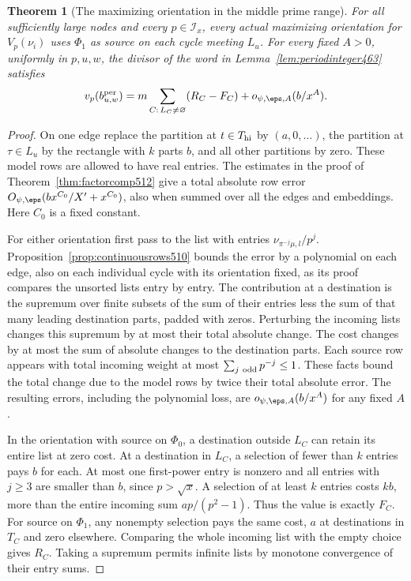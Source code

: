\documentclass[a4paper,11pt]{article}
\newtheorem{theorem}[proposition]{Theorem}
\theoremstyle{definition}
\theoremstyle{remark}
\numberwithin{equation}{section}
\begin{document}
\begin{theorem}[The maximizing orientation in the middle prime range]
\leavevmode\label{thm:cycleorientation674}
For all sufficiently large nodes and every \(p\in\mathcal I_x\),
every actual maximizing orientation for \(V_p(\nu_i)\) uses
\(\Phi_1\) as source on each cycle meeting \(L_u\). For every
fixed \(A>0\), uniformly in \(p,u,w\), the divisor of the word
in Lemma~\ref{lem:periodinteger463} satisfies
\[
 v_p(b^{\rm per}_{u,w})=
 m\sum_{C:\,L_C\ne\varnothing}(R_C-F_C)
                      +o_{\psi,\eps,A}(b/x^A).
\]
\end{theorem}
\begin{proof}
On one edge replace the partition at \(t\in T_{\rm hi}\) by
\((a,0,\ldots)\), the partition at \(\tau\in L_u\) by the
rectangle with \(k\) parts \(b\), and all other partitions by
zero. These model rows are allowed to have real entries.
The estimates in the proof of Theorem~\ref{thm:factorcomp512}
give a total absolute row error
\(O_{\psi,\eps}(b x^{C_0}/X'+x^{C_0})\), also when summed over
all the edges and embeddings. Here \(C_0\) is a fixed constant.

For either orientation first pass to the list with entries
\(\nu_{\pi^{-j}\mu,l}/p^j\). Proposition~\ref{prop:continuousrows510}
bounds the error by a polynomial on each edge, also on each
individual cycle with its orientation fixed, as its proof
compares the unsorted lists entry by entry. The contribution at
a destination is the supremum over finite subsets of the sum of
their entries less the sum of that many leading destination
parts, padded with zeros. Perturbing the incoming lists changes
this supremum by at most their total absolute change. The cost
changes by at most the sum of absolute changes to the destination
parts. Each source row appears with total incoming weight at most
\(\sum_{j\ {\rm odd}}p^{-j}\le1\). These facts bound the total
change due to the model rows by twice their total absolute error.
The resulting errors, including the polynomial loss, are
\(o_{\psi,\eps,A}(b/x^A)\) for any fixed \(A\).

In the orientation with source on \(\Phi_0\), a destination
outside \(L_C\) can retain its entire list at zero cost. At a
destination in \(L_C\), a selection of fewer than \(k\) entries
pays \(b\) for each. At most one first-power entry is nonzero
and all entries with \(j\ge3\) are smaller than \(b\), since
\(p>\sqrt x\). A selection of at least \(k\) entries costs
\(kb\), more than the entire incoming sum
\(a p/(p^2-1)\). Thus the value is exactly \(F_C\).
For source on \(\Phi_1\), any nonempty selection pays the same
cost, \(a\) at destinations in \(T_C\) and zero elsewhere.
Comparing the whole incoming list with the empty choice gives
\(R_C\). Taking a supremum permits infinite lists by monotone
convergence of their entry sums.


\end{proof}
\end{document}

